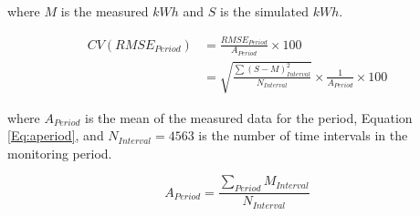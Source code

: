 where $M$ is the measured $kWh$ and $S$ is the simulated $kWh$.

\begin{align}\label{Eq:cvrmse}
\nonumber CV(RMSE_{Period}) &= \frac{RMSE_{Period}}{A_{Period}} \times 100 \\
				            &= \sqrt{\frac{\sum{(S-M)^2_{Interval}}}{N_{Interval}}} \times \frac 1{A_{Period}} \times 100
\end{align}

where $A_{Period}$ is the mean of the measured data for the period, Equation \eqref{Eq:aperiod}, and $N_{Interval} = 4563$ is the number of time intervals in the monitoring period.

\begin{equation}\label{Eq:aperiod}
A_{Period} = \frac{\sum_{Period}{M_{Interval}}}{N_{Interval}}
\end{equation}

